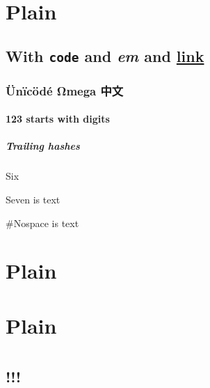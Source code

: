 \section{Plain}\label{plain}

\subsection{\texorpdfstring{With \texttt{code} and \emph{em} and
\href{u}{link}}{With code and em and link}}\label{with-code-and-em-and-link}

\subsubsection{Ünïcödé Ωmega
中文}\label{uxfcnuxefcuxf6duxe9-ux3c9mega-ux4e2dux6587}

\paragraph{123 starts with digits}\label{starts-with-digits}

\subparagraph{Trailing hashes}\label{trailing-hashes}

Six

Seven is text

\#Nospace is text

\section{Plain}\label{plain-1}

\section{Plain}\label{plain-2}

\section{}\label{section}

\subsection{!!!}\label{section-1}

